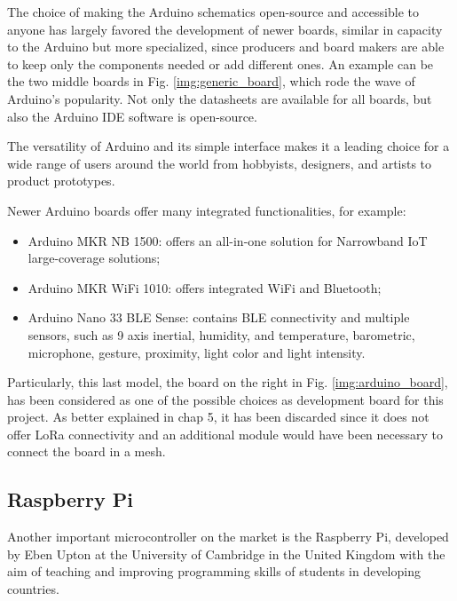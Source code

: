 		The choice of making the Arduino schematics open-source and accessible to anyone has largely favored the development of newer boards, similar in capacity to the Arduino but more specialized, since producers and board makers are able to keep only the components needed or add different ones.
		An example can be the two middle boards in Fig. \ref{img:generic_board}, which rode the wave of Arduino's popularity.
		Not only the datasheets are available for all boards, but also the Arduino IDE software is open-source.
		
		The versatility of Arduino and its simple interface makes it a leading choice for a wide range of users around the world from hobbyists, designers, and artists to product prototypes. 
		
		Newer Arduino boards offer many integrated functionalities, for example:
		\begin{itemize}[noitemsep]
			\item Arduino MKR NB 1500: offers an all-in-one solution for Narrowband IoT large-coverage solutions;
			\item Arduino MKR WiFi 1010: offers integrated WiFi and Bluetooth;
			\item Arduino Nano 33 BLE Sense: contains BLE connectivity and multiple sensors, such as 9 axis inertial, humidity, and temperature, barometric, microphone, gesture, proximity, light color and light intensity.
		\end{itemize}
	
		Particularly, this last model, the board on the right in Fig. \ref{img:arduino_board}, has been considered as one of the possible choices as development board for this project.
		As better explained in chap 5, it has been discarded since it does not offer LoRa connectivity and an additional module would have been necessary to connect the board in a mesh.
							
	\subsection{Raspberry Pi}

		Another important microcontroller on the market is the Raspberry Pi, developed by Eben Upton at the University of Cambridge in the United Kingdom with the aim of teaching and improving programming skills of students in developing countries.
		
